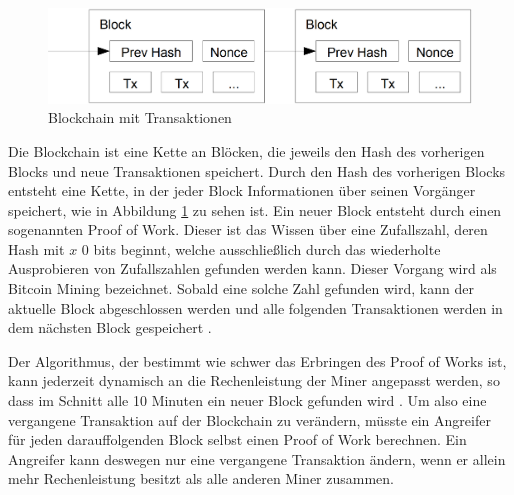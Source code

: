 \documentclass[
	fontsize=12pt,
	headings=small,
	parskip=half,           %
	bibliography=totoc,
	numbers=noenddot,       %
	open=any,               %
]{scrreprt}
\begin{document}
\begin{figure}
    \centering
    \label{fig:btc_blockchain}
    \includegraphics[width=0.5\linewidth]{BitcoinBlockchain.png}
    \caption{Blockchain mit Transaktionen \cite{btc-nakamoto2008bitcoin}}
\end{figure}

Die Blockchain ist eine Kette an Blöcken, die jeweils den Hash des vorherigen Blocks und neue Transaktionen speichert. Durch den Hash des vorherigen Blocks entsteht eine Kette, in der jeder Block Informationen über seinen Vorgänger speichert, wie in Abbildung \ref{fig:btc_blockchain} zu sehen ist. Ein neuer Block entsteht durch einen sogenannten Proof of Work. Dieser ist das Wissen über eine Zufallszahl, deren Hash mit $x$ 0 bits beginnt, welche ausschließlich durch das wiederholte Ausprobieren von Zufallszahlen gefunden werden kann. Dieser Vorgang wird als Bitcoin Mining bezeichnet. Sobald eine solche Zahl gefunden wird, kann der aktuelle Block abgeschlossen werden und alle folgenden Transaktionen werden in dem nächsten Block gespeichert \cite{btc-nakamoto2008bitcoin}.

Der Algorithmus, der bestimmt wie schwer das Erbringen des Proof of Works ist, kann jederzeit dynamisch an die Rechenleistung der Miner angepasst werden, so dass im Schnitt alle 10 Minuten ein neuer Block gefunden wird \cite{btc-Zaghloul2019Bitcoin}. Um also eine vergangene Transaktion auf der Blockchain zu verändern, müsste ein Angreifer für jeden darauffolgenden Block selbst einen Proof of Work berechnen. Ein Angreifer kann deswegen nur eine vergangene Transaktion ändern, wenn er allein mehr Rechenleistung besitzt als alle anderen Miner zusammen. \\
\end{document}
